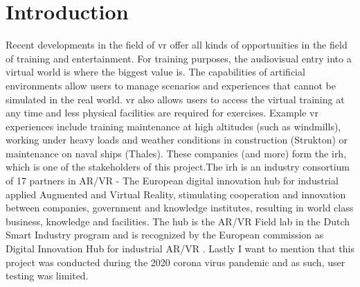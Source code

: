 \section{Introduction}
\label{sec:int}
Recent developments in the field of \acrfull{vr} offer all kinds of opportunities in the field of training
and entertainment. For training purposes, the audiovisual entry into a virtual world is where the biggest value is.
The capabilities of artificial environments allow users to manage scenarios and 
experiences that cannot be simulated in the real world. \acrshort{vr} also allows users to access the virtual training at any time
and less physical facilities are required for exercises. 
Example \acrshort{vr} experiences include training maintenance at high altitudes (such as windmills), working under heavy loads and weather conditions in construction (Strukton) or maintenance on naval ships (Thales). These companies (and more) form the \acrfull{irh}, which is one of the stakeholders of this project.The \acrshort{irh} is an industry consortium of 17 partners in AR/VR - The European digital innovation hub for industrial applied Augmented and Virtual Reality, stimulating cooperation and innovation between companies, government and knowledge institutes, resulting in world class business, knowledge and facilities. The hub is the AR/VR Field lab in the Dutch Smart Industry program and is recognized by the European commission as Digital Innovation Hub for industrial AR/VR \parencite{irh}. Lastly I want to mention that this project was conducted during the 2020 corona virus pandemic and as such, user testing was limited.